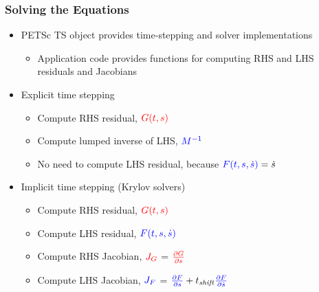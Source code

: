 \documentclass[aspectratio=169,hyperref=colorlinks]{beamer}
\begin{document}
\begin{frame}
  \frametitle{Solving the Equations}

  \begin{itemize}
  \item PETSc TS object provides time-stepping and solver implementations
    \begin{itemize}
    \item Application code provides functions for computing RHS and LHS residuals and Jacobians
    \end{itemize}
  \item Explicit time stepping
    \begin{itemize}
    \item Compute RHS residual, ${\color{red}G(t,s)}$
    \item Compute lumped inverse of LHS, ${\color{blue}M^{-1}}$
    \item No need to compute LHS residual, because ${\color{blue}F(t,s,\dot{s})} = \dot{s}$
    \end{itemize}
  \item Implicit time stepping (Krylov solvers)
    \begin{itemize}
    \item Compute RHS residual, ${\color{red}G(t,s)}$
    \item Compute LHS residual, ${\color{blue}F(t,s,\dot{s})}$
    \item Compute RHS Jacobian, ${\color{red}J_G}$ = ${\color{red}\frac{\partial G}{\partial s}}$
    \item Compute LHS Jacobian, ${\color{blue}J_F}$ = ${\color{blue}\frac{\partial F}{\partial s}} + t_\mathit{shift}{\color{blue}\frac{\partial F}{\partial \dot{s}}}$
    \end{itemize}
  \end{itemize}

\end{frame}
\end{document}
